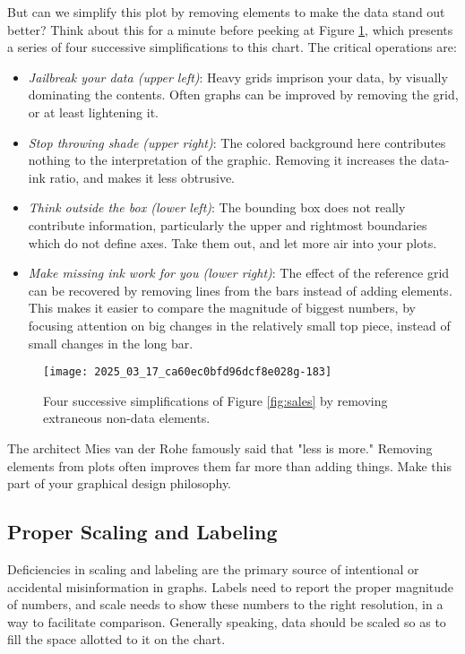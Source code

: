 \documentclass[10pt]{article}
\begin{document}
But can we simplify this plot by removing elements to make the data stand out better? Think about this for a minute before peeking at Figure \ref{fig:simplifications}, which presents a series of four successive simplifications to this chart. The critical operations are:

\begin{itemize}
  \item \emph{Jailbreak your data (upper left)}: Heavy grids imprison your data, by visually dominating the contents. Often graphs can be improved by removing the grid, or at least lightening it.
  \item \emph{Stop throwing shade (upper right)}: The colored background here contributes nothing to the interpretation of the graphic. Removing it increases the data-ink ratio, and makes it less obtrusive.
  \item \emph{Think outside the box (lower left)}: The bounding box does not really contribute information, particularly the upper and rightmost boundaries which do not define axes. Take them out, and let more air into your plots.
  \item \emph{Make missing ink work for you (lower right)}: The effect of the reference grid can be recovered by removing lines from the bars instead of adding elements. This makes it easier to compare the magnitude of biggest numbers, by focusing attention on big changes in the relatively small top piece, instead of small changes in the long bar.
\end{itemize}

\begin{figure}[h]
  \centering
  \texttt{[image: 2025\_03\_17\_ca60ec0bfd96dcf8e028g-183]}
  \caption{Four successive simplifications of Figure \ref{fig:sales} by removing extraneous non-data elements.}
  \label{fig:simplifications}
\end{figure}

The architect Mies van der Rohe famously said that "less is more." Removing elements from plots often improves them far more than adding things. Make this part of your graphical design philosophy.

\subsection{Proper Scaling and Labeling}
Deficiencies in scaling and labeling are the primary source of intentional or accidental misinformation in graphs. Labels need to report the proper magnitude of numbers, and scale needs to show these numbers to the right resolution, in a way to facilitate comparison. Generally speaking, data should be scaled so as to fill the space allotted to it on the chart.
\end{document}
